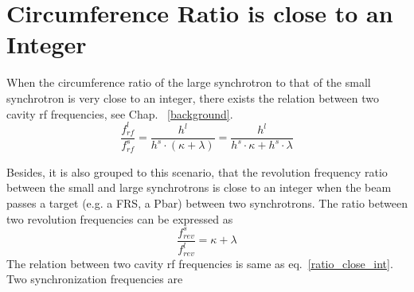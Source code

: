 \section{Circumference Ratio is close to an Integer}
\label{sec:close_to_int}
When the circumference ratio of the large synchrotron to that of the small synchrotron is very close to an integer, there exists the relation between two cavity rf frequencies, see Chap. ~\ref{background}. 
\begin{equation} 
\label{ratio_close_int}
\frac{f_{\mathit{rf}}^{l}}{f_{\mathit{rf}}^{s}}=\frac{h^l}{h^s \cdot ( \kappa+ \lambda)}=\frac{h^l}{h^s \cdot  \kappa+ h^s \cdot \lambda}
\end{equation}




Besides, it is also grouped to this scenario, that the revolution frequency ratio between the small and large synchrotrons is close to an integer when the beam passes a target (e.g. a FRS, a Pbar) between two synchrotrons. The ratio between two revolution frequencies can be expressed as
\begin{equation} 
\frac{f_{\mathit{rev}}^{s}}{f_{\mathit{rev}}^{l}}=\kappa+ \lambda\label{close_to_interger1}
\end{equation}
The relation between two cavity rf frequencies is same as eq.~\ref{ratio_close_int}. Two synchronization frequencies are


